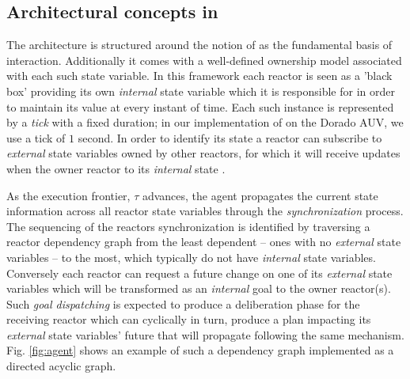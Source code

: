 \subsection{Architectural concepts in \rx}
\label{sec:arch:trex}

The \rx architecture is structured around the notion of  as the fundamental basis of interaction. Additionally it
comes with a well-defined ownership model associated with each such
state variable. In this framework each reactor is seen as a 'black
box' providing its own {\em internal} state variable which it is
responsible for in order to maintain its value at every instant of
time. Each such instance is represented by a {\em tick} with a fixed
duration; in our implementation of \rx on the Dorado AUV, we use a
tick of $1$ second. In order to identify its state a reactor can
subscribe to {\em external} state variables owned by other reactors,
for which it will receive updates when the owner reactor
 to its {\em internal} state .


As the execution frontier, $\tau$ advances, the \rx agent propagates
the current state information across all reactor state variables
through the {\em synchronization} process.  The sequencing of the
reactors synchronization is identified by traversing a reactor
dependency graph from the least dependent -- ones with no {\em
  external} state variables -- to the most, \ie which typically do not
have {\em internal} state variables. Conversely each reactor can
request a future change on one of its {\em external} state variables
which will be transformed as an {\em internal} goal to the owner
reactor(s).  Such \emph{goal dispatching} is expected to produce a
deliberation phase for the receiving reactor which can cyclically in
turn, produce a plan impacting its {\em external} state variables'
future that will propagate  following the
same mechanism. Fig. \ref{fig:agent} shows an example of such a
dependency graph implemented as a directed acyclic graph.


